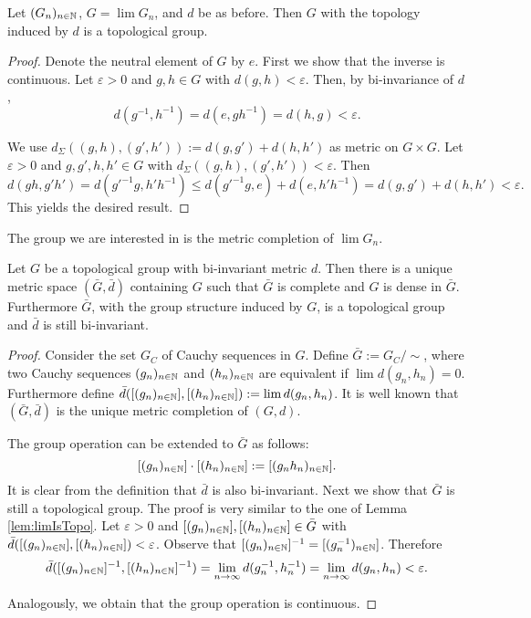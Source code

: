 \begin{lemma}\label{lem:limIsTopo}
	Let $(G_n)_{n\in\mathbb{N}}$, $G=\lim G_n$, and $d$ be as before. Then $G$ with the topology induced by $d$ is a topological group.
\end{lemma}
\begin{proof}
	Denote the neutral element of $G$ by $e$. First we show that the inverse is continuous. Let $\varepsilon>0$ and $g,h\in G$ with $d(g,h)<\varepsilon$. Then, by bi-invariance of $d$,
	\[d(g^{-1},h^{-1})=d(e,gh^{-1})=d(h,g)<\varepsilon.\]
				
	We use $d_\Sigma((g,h),(g',h')):=d(g,g')+d(h,h')$ as metric on $G\times G$. Let $\varepsilon>0$ and $g,g',h,h'\in G$ with $d_\Sigma((g,h),(g',h'))<\varepsilon$. Then
	\[d(gh,g'h')=d(g'^{-1}g,h'h^{-1})\leq d(g'^{-1}g,e)+d(e,h'h^{-1})=d(g,g')+d(h,h')<\varepsilon.\]
	This yields the desired result.
\end{proof}
		
		
The group we are interested in is the metric completion of $\lim G_n$. 
\begin{lemma}\label{lem:climIsTopo}
	Let $G$ be a topological group with bi-invariant metric $d$. Then there is a unique metric space $(\bar G,\bar d)$ containing $G$ such that $\bar G$ is complete and $G$ is dense in $\bar G$. Furthermore $\bar G$, with the group structure induced by $G$, is a topological group and $\bar d$ is still bi-invariant.
\end{lemma}
\begin{proof}
	Consider the set $G_C$ of Cauchy sequences in $G$. Define $\bar G:=G_C/\sim$, where two Cauchy sequences $(g_n)_{n\in\mathbb{N}}$ and $(h_n)_{n\in\mathbb{N}}$ are equivalent if $\lim d(g_n,h_n)=0$. Furthermore define $\bar d([(g_n)_{n\in\mathbb{N}}],[(h_n)_{n\in\mathbb{N}}]):=\lim d(g_n,h_n)$. It is well known that $(\bar G,\bar d)$ is the unique metric completion of $(G,d)$.
				
	The group operation can be extended to $\bar G$ as follows:
	\[[(g_n)_{n\in\mathbb{N}}]\cdot[(h_n)_{n\in\mathbb{N}}]:=[(g_nh_n)_{n\in\mathbb{N}}].\]
	It is clear from the definition that $\bar d$ is also bi-invariant. Next we show that $\bar G$ is still a topological group. 
	The proof is very similar to the one of Lemma \ref{lem:limIsTopo}.
	Let $\varepsilon>0$ and $[(g_n)_{n\in\mathbb{N}}],[(h_n)_{n\in\mathbb{N}}]\in\bar G$ with $\bar d([(g_n)_{n\in\mathbb{N}}],[(h_n)_{n\in\mathbb{N}}])<\varepsilon$. Observe that $[(g_n)_{n\in\mathbb{N}}]^{-1}=[(g_n^{-1})_{n\in\mathbb{N}}]$. Therefore
	\[\bar d([(g_n)_{n\in\mathbb{N}}]^{-1},[(h_n)_{n\in\mathbb{N}}]^{-1})=\lim_{n\to\infty} d(g_n^{-1},h_n^{-1})=\lim_{n\to\infty} d(g_n,h_n)<\varepsilon. \]
				
	Analogously, we obtain that the group operation is continuous.
\end{proof}
		
